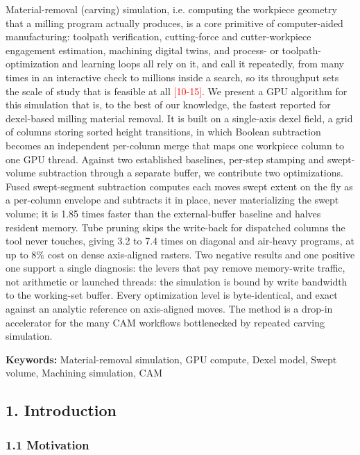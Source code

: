 \documentclass[
]{article}
\begin{document}
Material-removal (carving) simulation, i.e. computing the workpiece geometry
that a milling program actually produces, is a core primitive of
computer-aided manufacturing: toolpath verification, cutting-force and
cutter-workpiece engagement estimation, machining digital twins, and
process- or toolpath-optimization and learning loops all rely on it, and
call it repeatedly, from many times in an interactive check to millions
inside a search, so its throughput sets the scale of study that is
feasible at all \textcolor{red}{[10-15]}. We present a GPU algorithm for this
simulation that is, to the best of our knowledge, the fastest reported
for dexel-based milling material removal. It is built on a single-axis
dexel field, a grid of columns storing sorted height transitions, in
which Boolean subtraction becomes an independent per-column merge that
maps one workpiece column to one GPU thread. Against two established
baselines, per-step stamping and swept-volume subtraction through a
separate buffer, we contribute two optimizations. Fused swept-segment
subtraction computes each move\textquotesingle s swept extent on the fly
as a per-column envelope and subtracts it in place, never materializing
the swept volume; it is 1.85 times faster than the external-buffer
baseline and halves resident memory. Tube pruning skips the write-back
for dispatched columns the tool never touches, giving 3.2 to 7.4 times
on diagonal and air-heavy programs, at up to 8\% cost on dense
axis-aligned rasters. Two negative results and one positive one support
a single diagnosis: the levers that pay remove memory-write traffic, not
arithmetic or launched threads: the simulation is bound by write
bandwidth to the working-set buffer. Every optimization level is
byte-identical, and exact against an analytic reference on axis-aligned
moves. The method is a drop-in accelerator for the many CAM workflows
bottlenecked by repeated carving simulation.

\textbf{Keywords:} Material-removal simulation, GPU compute, Dexel
model, Swept volume, Machining simulation, CAM

\hypertarget{introduction}{%
\subsection{1. Introduction}\label{introduction}}

\hypertarget{motivation}{%
\subsubsection{1.1 Motivation}\label{motivation}}
\end{document}
